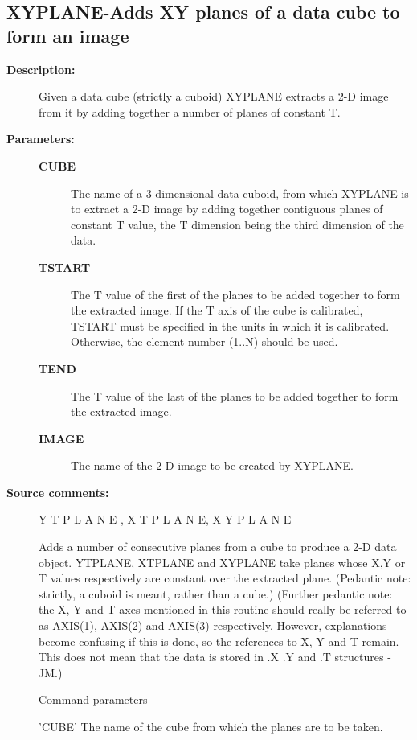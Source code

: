 \subsection{XYPLANE-\label{XYPLANE}Adds XY planes of a data cube to form an image}
\begin{description}

\item [\textbf{Description:}]
 Given a data cube (strictly a cuboid) XYPLANE extracts a 2-D image
 from it by adding together a number of planes of constant T.

\item [\textbf{Parameters:}]
\begin{description}
\item [\textbf{CUBE}]
 The name of a 3-dimensional data cuboid,
 from which XYPLANE is to extract a 2-D image by adding
 together contiguous planes of constant T value, the
 T dimension being the third dimension of the data.
\item [\textbf{TSTART}]
 The T value of the first of the planes to
 be added together to form the extracted image.  If
 the T axis of the cube is calibrated, TSTART must be
 specified in the units in which it is calibrated.
 Otherwise, the element number (1..N) should be used.
\item [\textbf{TEND}]
 The T value of the last of the planes to
 be added together to form the extracted image.
\item [\textbf{IMAGE}]
 The name of the 2-D image to be created by XYPLANE.
\end{description}

\item [\textbf{Source comments:}]
\begin{terminalv}
 Y T P L A N E ,   X T P L A N E,    X Y P L A N E

 Adds a number of consecutive planes from a cube to
 produce a 2-D data object.  YTPLANE, XTPLANE and XYPLANE
 take planes whose X,Y or T values respectively are
 constant over the extracted plane.  (Pedantic note:
 strictly, a cuboid is meant, rather than a cube.)
 (Further pedantic note: the X, Y and T axes
 mentioned in this routine should really be referred to
 as AXIS(1), AXIS(2) and AXIS(3) respectively. However,
 explanations become confusing if this is done, so the references to
 X, Y and T remain. This does not mean that the data is stored in
 .X .Y and .T structures - JM.)

 Command parameters -

 'CUBE'     The name of the cube from which the planes
            are to be taken.


\end{terminalv}
\end{description}
